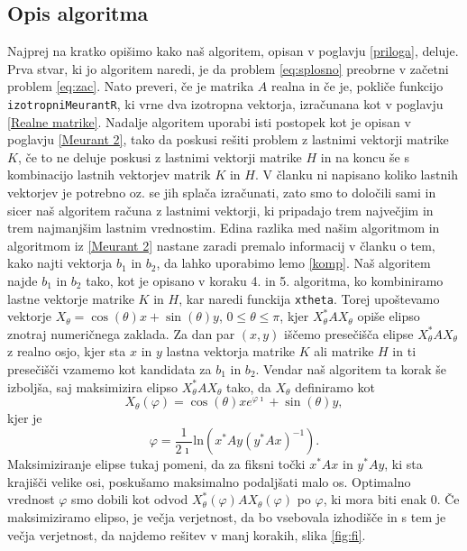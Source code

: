 \documentclass[12pt,a4paper]{amsart}
\theoremstyle{definition}
\theoremstyle{plain}
\begin{document}
\subsection{Opis algoritma}
Najprej na kratko opišimo kako naš algoritem, opisan v poglavju \ref{priloga}, deluje. \\
Prva stvar, ki jo algoritem naredi, je da problem \eqref{eq:splosno} preobrne v začetni problem \eqref{eq:zac}. 
Nato preveri, če je matrika $A$ realna in če je, pokliče funkcijo \verb+izotropniMeurantR+, ki vrne dva izotropna vektorja, izračunana kot v poglavju \ref{Realne matrike}. 
Nadalje algoritem uporabi isti postopek kot je opisan v poglavju \ref{Meurant 2}, tako da poskusi rešiti problem z lastnimi vektorji matrike $K$, če to ne deluje poskusi z lastnimi vektorji matrike $H$ in na koncu še s kombinacijo lastnih vektorjev matrik $K$ in $H$. 
V članku \cite{meurant} ni napisano koliko lastnih vektorjev je potrebno oz. se jih splača izračunati, zato smo to določili sami in sicer naš algoritem računa z lastnimi vektorji, ki pripadajo trem največjim in trem najmanjšim lastnim vrednostim. 
Edina razlika med našim algoritmom in algoritmom iz \ref{Meurant 2} nastane zaradi premalo informacij v članku \cite{meurant} o tem, kako najti vektorja $b_1$ in $b_2$, da lahko uporabimo lemo \ref{komp}. 
Naš algoritem najde $b_1$ in $b_2$ tako, kot je opisano v koraku 4. in 5. algoritma, ko kombiniramo lastne vektorje matrike $K$ in $H$, kar naredi funckija \verb+xtheta+. 
Torej upoštevamo vektorje $X_\theta =\cos(\theta)x+\sin(\theta)y$, $0\le\theta\le\pi$, kjer $X_\theta ^\ast AX_\theta$ opiše elipso znotraj numeričnega zaklada. 
Za dan par $(x,y)$ iščemo presečišča elipse $X_\theta ^\ast AX_\theta$ z realno osjo, kjer sta $x$ in $y$ lastna vektorja matrike $K$ ali matrike $H$ in ti presečišči vzamemo kot kandidata za $b_1$ in $b_2$. 
Vendar naš algoritem ta korak še izboljša, saj maksimizira elipso $X_\theta ^\ast AX_\theta$ tako, da $X_\theta$ definiramo kot 
$$X_\theta (\varphi) =\cos(\theta)x e^{\varphi \imath}+\sin(\theta)y,$$ kjer je $$\varphi = \frac{1}{2\imath} \text{ln}(x^\ast Ay (y^\ast Ax)^{-1}).$$ 
Maksimiziranje elipse tukaj pomeni, da za fiksni točki $x^\ast Ax$ in $y^\ast Ay$, ki sta krajišči velike osi, poskušamo maksimalno podaljšati malo os.
Optimalno vrednost $\varphi$ smo dobili kot odvod $X_\theta ^\ast (\varphi) A X_\theta (\varphi)$ po $\varphi$, ki mora biti enak $0$.
Če maksimiziramo elipso, je večja verjetnost, da bo vsebovala izhodišče in s tem je večja verjetnost, da najdemo rešitev v manj korakih, slika \ref{fig:fi}.
\end{document}

